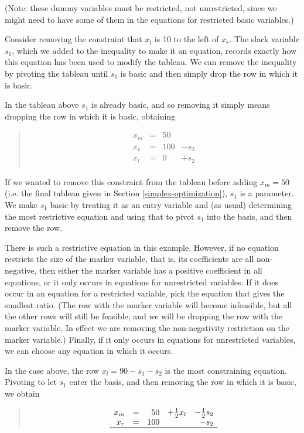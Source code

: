 \documentclass{article}
\begin{document}
(Note: these dummy variables must be restricted, not unrestricted, since we
might need to have some of them in the equations for restricted basic
variables.)

Consider removing the constraint that $x_l$ is 10 to the left of $x_r$.
The slack variable $s_1$, which we added to the inequality to make it
an equation, records exactly how this equation has been used to modify the
tableau.  We can remove the inequality by pivoting the tableau until 
$s_1$ is basic and then simply drop the row in which it is basic.

In the tableau above $s_1$ is already basic, and so removing it simply means
dropping the row in which it is basic, obtaining
\begin{quote}\vspace*{-1ex}
$$
\begin{array}{rlrrr} 
x_m & = &50   \\
x_r & = &100 & - s_2 \\ \hline
x_l & = &0 & + s_2 \\

\end{array}
$$
\end{quote}\vspace{-0.9ex}

If we wanted to remove this constraint
from the tableau before adding $x_m = 50$ (i.e. the final tableau given in
Section \ref{simplex-optimization}), $s_1$ is a parameter.
We make $s_1$ basic by treating it as an entry variable and
(as usual) determining the most restrictive equation and using that 
to pivot $s_1$ into the basis, and then remove the row.

There is such a restrictive equation in this example.  However, if no
equation restricts the size of the marker variable, that is, its
coefficients are all non-negative, then either the marker variable has a
positive coefficient in all equations, or it only occurs in equations for
unrestricted variables.  If it does occur in an equation for a restricted
variable, pick the equation that gives the smallest ratio.  (The row with
the marker variable will become infeasible, but all the other rows will
still be feasible, and we will be dropping the row with the marker
variable.  In effect we are removing the non-negativity restriction on the
marker variable.)  Finally, if it only occurs in equations for unrestricted
variables, we can choose any equation in which it occurs.

In the case above, the row $x_l  = 90  - s_1  - s_2$
is the most constraining equation.
Pivoting to let $s_1$ enter the
basis, and then removing the row in which it is basic, we obtain
\begin{quote}\vspace*{-1ex}
$$
\begin{array}{rlrrr} 
x_m & = &50 & + \frac{1}{2} x_l & - \frac{1}{2} s_2 \\
x_r & = &100 &  & - s_2 \\ \hline
\end{array}
$$
\end{quote}\vspace{-0.9ex}
\end{document}
